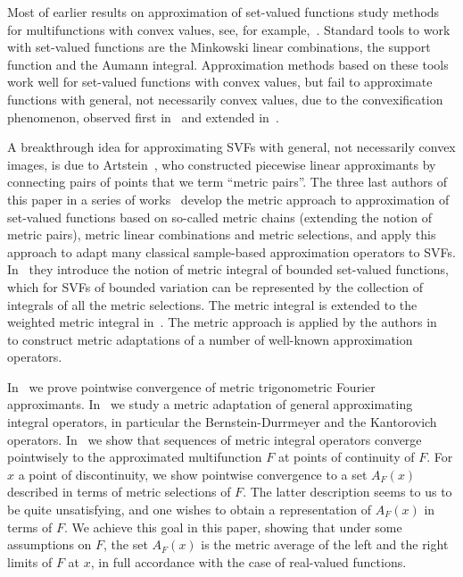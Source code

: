 \documentclass[final,3p,mathptmx]{article}%
\begin{document}
{{{{Most of earlier results on approximation of set-valued functions study methods for multifunctions with convex values, see, for example,~\cite{Babenko:2016, BaierPerria:11, Campiti:2019, DynFarkhi:00, Lempio:95, Muresan:SVApprox2010, MNikolskii:Opt90, VIT:79}. 
Standard tools to work with set-valued functions are the Minkowski linear combinations, the support function and the Aumann integral.
Approximation methods based on these tools work well for set-valued functions with convex values, but fail to approximate functions with general, not necessarily convex values, due to the convexification phenomenon, observed first in~\cite{VIT:79} and extended in~\cite{DF:04}.

A breakthrough idea for approximating SVFs with general, not necessarily convex images, is due to Artstein~\cite{Artstein:MA}, who constructed piecewise linear approximants by connecting pairs of points that we term ``metric pairs''.
The three last authors of this paper in a series of works~\cite{DynFarkhi:01, DFM:Chains, DFM:07serdica, DFM:Book_SV-Approx, DynMokhov:06} develop the metric approach to approximation of set-valued functions based on so-called metric chains (extending the notion of metric pairs), metric linear combinations and metric selections, and apply this approach to adapt many classical sample-based approximation operators to SVFs. In~\cite{DFM:MetricIntegral} they introduce the notion of metric integral of bounded set-valued functions, which for SVFs of bounded variation can be represented by the collection of integrals of all the metric selections. The metric integral is extended to the weighted metric integral in~\cite{BDFM:2021}. The metric approach is applied by the authors in~\cite{BDFM:2019, BDFM:2021, BDFM:2022} to construct metric adaptations of a number of well-known approximation operators.


In~\cite{BDFM:2021} we prove pointwise convergence of metric trigonometric Fourier approximants.  In~\cite{BDFM:2022} we study a metric adaptation of general approximating integral operators, in particular the Bernstein-Durrmeyer and the Kantorovich operators. In~\cite{BDFM:2021, BDFM:2022} we show that sequences of metric integral operators converge pointwisely to the approximated multifunction $F$ at points of continuity of $F$. For $x$ a point of discontinuity, we show pointwise convergence to a set $A_F(x)$ described in terms of metric selections of $F$. The latter description seems to us to be quite unsatisfying, and one wishes to obtain a representation of $A_F(x)$ in terms of $F$. We achieve this goal in this paper, showing that under some assumptions on $F$, the set $A_F(x)$ is the metric average of the left and the right limits of $F$ at $x$, in full accordance with the case of real-valued functions.

}}}}
\end{document}
